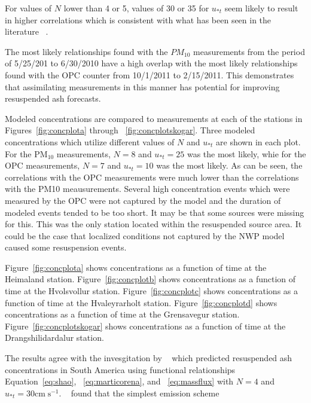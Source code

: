 For values of $N$ lower than 4 or 5, values of 30 or 35 for $u_{*t}$ seem likely to result in higher correlations 
 which is consistent with what
has been seen in the literature ~\citep{Leadbetter12, Folch14}.

The most likely relationships found with the $PM_{10}$ measurements from the period of 5/25/201 to 6/30/2010 have
a high overlap with the most likely relationships found with the OPC counter from 10/1/2011 to 2/15/2011.
This demonstrates that assimilating measurements in this manner has potential for improving resuspended ash forecasts.

Modeled concentrations are compared to measurements at each of the stations in Figures~\ref{fig:concplota} through ~\ref{fig:concplotskogar}.
Three modeled concentrations which utilize different values of $N$ and $u_{*t}$ are shown in each plot.
For the PM$_{10}$ measurements, $N=8$ and $u_{*t}=25$ was the most likely, whie for the OPC measurements, $N=7$ and $u_{*t}=10$
was the most likely.  As can be seen, the correlations with the OPC measurements were much lower than the correlations with the PM10 meausurements.
Several high concentration events which were measured by the OPC were not captured by the model and the duration of modeled events tended to be
too short. It may be that some sources were missing for this. This was the only station located within the resuspended source area. It could
be the case that localized conditions not captured by the NWP model caused some resuspension events.

Figure~\ref{fig:concplota} shows concentrations as a function of time at the Heimaland station.
Figure~\ref{fig:concplotb} shows concentrations as a function of time at the Hvolsvollur station.
Figure~\ref{fig:concplotc} shows concentrations as a function of time at the Hvaleyrarholt station.
Figure~\ref{fig:concplotd} shows concentrations as a function of time at the Grensavegur station.
Figure~\ref{fig:concplotskogar} shows concentrations as a function of time at the Drangshilidardalur station.


\conclusions  %

The results agree with the invesgitation by ~\cite{Folch14} which predicted resuspended ash concentrations in South America using functional
relationships Equation~\ref{eq:shao}, ~\ref{eq:marticorena}, and ~\ref{eq:massflux} with $N=4$ and $u_{*t}=30\mathrm{cm}\;\mathrm{s}^{-1}$.
~\cite{Folch14} found that the simplest emission scheme 

